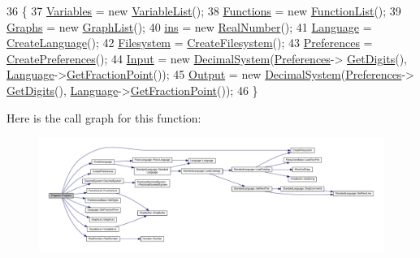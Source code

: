 \begin{DoxyCode}
36 \{
37     \hyperlink{classProgram_a1d4f53befb0270e64c91c24d14061188}{Variables} = \textcolor{keyword}{new} \hyperlink{classVariableList}{VariableList}();
38     \hyperlink{classProgram_ac643877adc06800a021263b2234cd236}{Functions} = \textcolor{keyword}{new} \hyperlink{classFunctionList}{FunctionList}();
39     \hyperlink{classProgram_a9c59323b8c560d2d418a6e6ebcde2e9d}{Graphs} = \textcolor{keyword}{new} \hyperlink{classGraphList}{GraphList}();
40     \hyperlink{classProgram_a2e25341cb34cfdd6446deeadd0629528}{ins} = \textcolor{keyword}{new} \hyperlink{structRealNumber}{RealNumber}();
41     \hyperlink{classLanguage}{Language} = \hyperlink{io_8h_a28bdfc208e3840f49d1af4a4196013e1}{CreateLanguage}();
42     \hyperlink{classProgram_a54fb0dc3ee40a356fe91cea64e569b26}{Filesystem} = \hyperlink{io_8h_aaf891622b11e0bb888ebf08612884aa8}{CreateFilesystem}();
43     \hyperlink{classProgram_ad6baa89972cb4938db341c77c1510793}{Preferences} = \hyperlink{io_8h_ae6bd8b440ad1736316165c2f8aac43bf}{CreatePreferences}();
44     \hyperlink{classProgram_a6327f15962926e4f74f15e8ff56e04e5}{Input} = \textcolor{keyword}{new} \hyperlink{classDecimalSystem}{DecimalSystem}(\hyperlink{classProgram_ad6baa89972cb4938db341c77c1510793}{Preferences}->
      \hyperlink{classPreferencesBase_a8d693cb289d1f5282f13c0cfb698b8cc}{GetDigits}(), \hyperlink{classLanguage}{Language}->\hyperlink{classLanguage_a4c214f08d47e84d53f37bcb5b1fe1b65}{GetFractionPoint}());
45     \hyperlink{classProgram_ac6e84e81a8bbdf99de5beea93713d8ee}{Output} = \textcolor{keyword}{new} \hyperlink{classDecimalSystem}{DecimalSystem}(\hyperlink{classProgram_ad6baa89972cb4938db341c77c1510793}{Preferences}->
      \hyperlink{classPreferencesBase_a8d693cb289d1f5282f13c0cfb698b8cc}{GetDigits}(), \hyperlink{classLanguage}{Language}->\hyperlink{classLanguage_a4c214f08d47e84d53f37bcb5b1fe1b65}{GetFractionPoint}());
46 \}
\end{DoxyCode}


Here is the call graph for this function\+:\nopagebreak
\begin{figure}[H]
\begin{center}
\leavevmode
\includegraphics[width=350pt]{classProgram_aaefaa0df08f3484476fc4d61e97acbdc_cgraph}
\end{center}
\end{figure}




